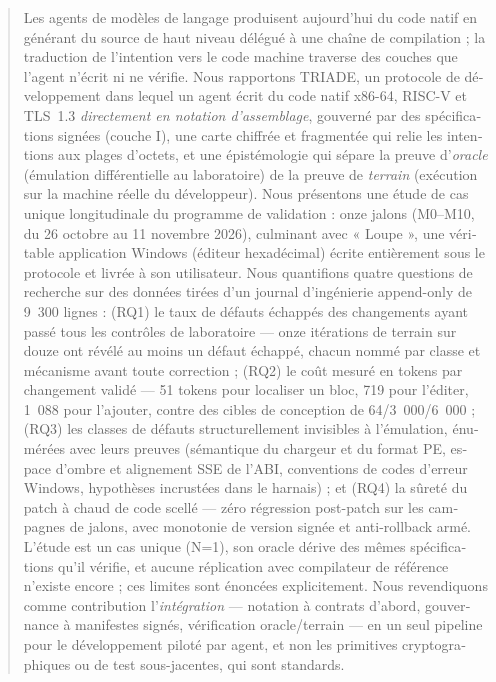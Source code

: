\documentclass[11pt,a4paper]{article}
\begin{document}
\begin{otherlanguage}{french}
\begin{abstract}
\noindent Les agents de modèles de langage produisent aujourd'hui du code
natif en générant du source de haut niveau délégué à une chaîne de
compilation ; la traduction de l'intention vers le code machine traverse
des couches que l'agent n'écrit ni ne vérifie. Nous rapportons TRIADE, un
protocole de développement dans lequel un agent écrit du code natif
x86-64, RISC-V et TLS~1.3 \emph{directement en notation d'assemblage},
gouverné par des spécifications signées (couche I), une carte chiffrée et
fragmentée qui relie les intentions aux plages d'octets, et une
épistémologie qui sépare la preuve d'\emph{oracle} (émulation
différentielle au laboratoire) de la preuve de \emph{terrain} (exécution
sur la machine réelle du développeur). Nous présentons une étude de cas
unique longitudinale du programme de validation : onze jalons (M0--M10, du
26 octobre au 11 novembre 2026), culminant avec « Loupe », une véritable
application Windows (éditeur hexadécimal) écrite entièrement sous le
protocole et livrée à son utilisateur. Nous quantifions quatre questions
de recherche sur des données tirées d'un journal d'ingénierie append-only
de 9~300 lignes : (RQ1) le taux de défauts échappés des changements ayant
passé tous les contrôles de laboratoire — onze itérations de terrain sur
douze ont révélé au moins un défaut échappé, chacun nommé par classe et
mécanisme avant toute correction ; (RQ2) le coût mesuré en tokens par
changement validé — 51 tokens pour localiser un bloc, 719 pour l'éditer,
1~088 pour l'ajouter, contre des cibles de conception de 64/3~000/6~000 ;
(RQ3) les classes de défauts structurellement invisibles à l'émulation,
énumérées avec leurs preuves (sémantique du chargeur et du format PE,
espace d'ombre et alignement SSE de l'ABI, conventions de codes d'erreur
Windows, hypothèses incrustées dans le harnais) ; et (RQ4) la sûreté du
patch à chaud de code scellé — zéro régression post-patch sur les
campagnes de jalons, avec monotonie de version signée et anti-rollback
armé. L'étude est un cas unique (N=1), son oracle dérive des mêmes
spécifications qu'il vérifie, et aucune réplication avec compilateur de
référence n'existe encore ; ces limites sont énoncées explicitement. Nous
revendiquons comme contribution l'\emph{intégration} — notation à
contrats d'abord, gouvernance à manifestes signés, vérification
oracle/terrain — en un seul pipeline pour le développement piloté par
agent, et non les primitives cryptographiques ou de test sous-jacentes,
qui sont standards.
\end{abstract}
\end{otherlanguage}
\end{document}
